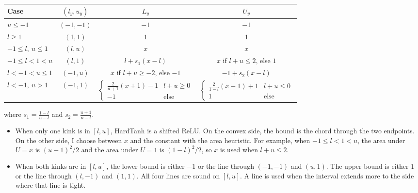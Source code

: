 \begin{center}
\renewcommand{\arraystretch}{1.3}
\begin{tabular}{|l|c|c|c|}
\hline
Case & $(l_y,u_y)$ & $L_y$ & $U_y$ \\
\hline
$u\le-1$ & $(-1,-1)$ & $-1$ & $-1$ \\
$l\ge1$ & $(1,1)$ & $1$ & $1$ \\
$-1\le l,\ u\le1$ & $(l,u)$ & $x$ & $x$ \\
$-1\le l<1<u$ & $(l,1)$ & $l+s_1(x-l)$ & $x$ if $l+u\le2$, else $1$ \\
$l<-1<u\le1$ & $(-1,u)$ & $x$ if $l+u\ge-2$, else $-1$ & $-1+s_2(x-l)$ \\
$l<-1,\ u>1$ & $(-1,1)$ &
  $\begin{cases}\frac{2}{u+1}(x+1)-1 & l+u\ge0\\ -1 & \text{else}\end{cases}$ &
  $\begin{cases}\frac{2}{1-l}(x-1)+1 & l+u\le0\\ 1 & \text{else}\end{cases}$ \\
\hline
\end{tabular}
\end{center}
where $s_1=\frac{1-l}{u-l}$ and $s_2=\frac{u+1}{u-l}$.

\begin{itemize}
  \item When only one kink is in $[l,u]$, HardTanh is a shifted ReLU.
        On the convex side, the bound is the chord through the two
        endpoints. On the other side, I choose between $x$ and the
        constant with the area heuristic. For example, when
        $-1\le l<1<u$, the area under $U=x$ is $(u-1)^2/2$ and the area
        under $U=1$ is $(1-l)^2/2$, so $x$ is used when $l+u\le2$.
  \item When both kinks are in $[l,u]$, the lower bound is either $-1$
        or the line through $(-1,-1)$ and $(u,1)$. The upper bound is
        either $1$ or the line through $(l,-1)$ and $(1,1)$. All four
        lines are sound on $[l,u]$. A line is used when the interval
        extends more to the side where that line is tight.
\end{itemize}

